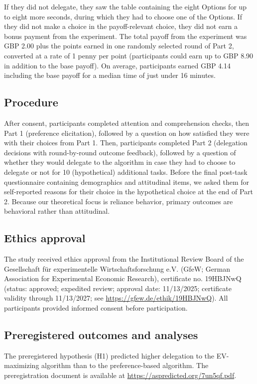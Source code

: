 \documentclass[a4paper, 12pt, fleqn]{article}
\theoremstyle{definition}
\begin{document}
If they did not delegate, they saw the table containing the eight Options for up to eight more seconds, during which they had to choose one of the Options. If they did not make a choice in the payoff-relevant choice, they did not earn a bonus payment from the experiment. The total payoff from the experiment was GBP 2.00 plus the points earned in one randomly selected round of Part 2, converted at a rate of 1 penny per point (participants could earn up to GBP 8.90 in addition to the base payoff). On average, participants earned GBP 4.14 including the base payoff for a median time of just under 16 minutes.

\subsection{Procedure}
After consent, participants completed attention and comprehension checks, then Part 1 (preference elicitation), followed by a question on how satisfied they were with their choices from Part 1. Then, participants completed Part 2 (delegation decisions with round-by-round outcome feedback), followed by a question of whether they would delegate to the algorithm in case they had to choose to delegate or not for 10 (hypothetical) additional tasks. Before the final post-task questionnaire containing demographics and attitudinal items, we asked them for self-reported reasons for their choice in the hypothetical choice at the end of Part 2. Because our theoretical focus is reliance behavior, primary outcomes are behavioral rather than attitudinal.

\subsection{Ethics approval}
The study received ethics approval from the Institutional Review Board of the Gesellschaft für experimentelle Wirtschaftsforschung e.V. (GfeW; German Association for Experimental Economic Research), certificate no. 19HBJNwQ (status: approved; expedited review; approval date: 11/13/2025; certificate validity through 11/13/2027; see {\footnotesize\url{https://gfew.de/ethik/19HBJNwQ}}). All participants provided informed consent before participation.

\subsection{Preregistered outcomes and analyses}
The preregistered hypothesis (H1) predicted higher delegation to the EV-maximizing algorithm than to the preference-based algorithm.
The preregistration document is available at {\footnotesize\url{https://aspredicted.org/7un5qf.pdf}}.
\end{document}
